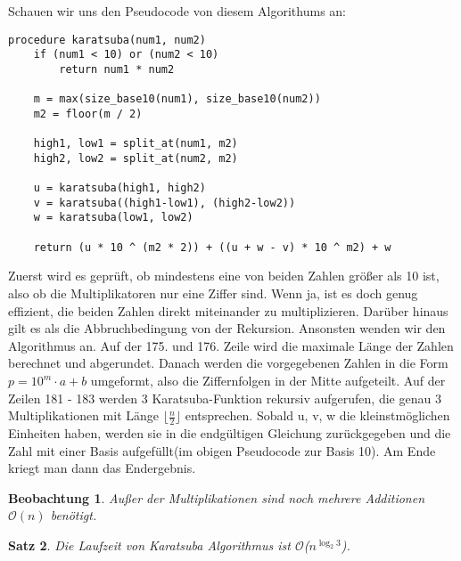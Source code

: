 \documentclass[11pt,a4paper, twoside]{article}
\newtheorem{theorem}{Satz}
\newtheorem{observation}[theorem]{Beobachtung}
\theoremstyle{definition}
\begin{document}
Schauen wir uns den Pseudocode \cite{1} von diesem Algorithums an:\\
\begin{lstlisting}
procedure karatsuba(num1, num2)
    if (num1 < 10) or (num2 < 10)
        return num1 * num2
    
    m = max(size_base10(num1), size_base10(num2))
    m2 = floor(m / 2) 
    
    high1, low1 = split_at(num1, m2)
    high2, low2 = split_at(num2, m2)
    
    u = karatsuba(high1, high2)
    v = karatsuba((high1-low1), (high2-low2))
    w = karatsuba(low1, low2)
    
    return (u * 10 ^ (m2 * 2)) + ((u + w - v) * 10 ^ m2) + w
\end{lstlisting}
Zuerst wird es geprüft, ob mindestens eine von beiden Zahlen größer als 10 ist, also ob die Multiplikatoren nur eine Ziffer sind. Wenn ja, ist es doch genug effizient, die beiden Zahlen direkt miteinander zu multiplizieren. Darüber hinaus gilt es als die Abbruchbedingung von der Rekursion. Ansonsten wenden wir den Algorithmus an. Auf der 175. und 176. Zeile wird die maximale Länge der Zahlen berechnet und abgerundet. Danach werden die vorgegebenen Zahlen in die Form $p = 10^{m} \cdot a + b$ umgeformt, also die Ziffernfolgen in der Mitte aufgeteilt. Auf der Zeilen 181 - 183 werden 3 Karatsuba-Funktion rekursiv aufgerufen, die genau 3 Multiplikationen mit Länge $\lfloor \frac{n}{2} \rfloor$ entsprechen. Sobald u, v, w die kleinstmöglichen Einheiten haben, werden sie in die endgültigen Gleichung zurückgegeben und die Zahl mit einer Basis aufgefüllt(im obigen Pseudocode zur Basis 10). Am Ende kriegt man dann das Endergebnis.

\begin{observation}
Außer der Multiplikationen sind noch mehrere Additionen $\mathcal{O}(n)$ benötigt.
\end{observation}

\begin{theorem}
Die Laufzeit von Karatsuba Algorithmus ist $\mathcal{O}$($n^{\log_{2}{3}}$).
\end{theorem}
\end{document}

